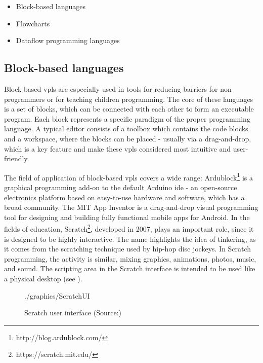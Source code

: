 \begin{itemize}
    \item Block-based languages
    \item Flowcharts
    \item Dataflow programming languages
\end{itemize}

\subsection{Block-based languages}
Block-based \glspl{vpl} are especially used in tools for reducing barriers for non-programmers or for teaching children programming. The core of these languages is a set of blocks, which can be connected with each other to form an executable program. Each block represents a specific paradigm of the proper programming language. A typical editor consists of a toolbox which contains the code blocks and a workspace, where the blocks can be placed - usually via a drag-and-drop, which is a key feature and make these \glspl{vpl} considered most intuitive and user-friendly.

The field of application of block-based \glspl{vpl} covers a wide range: Ardublock\footnote{http://blog.ardublock.com/} is a graphical programming add-on to the default Arduino \gls{ide} - an open-source electronics platform based on easy-to-use hardware and software, which has a broad community. The MIT App Inventor is a drag-and-drop visual programming tool for designing and building fully functional mobile apps for Android.\cite{AppInventor} In the fields of education, Scratch\footnote{https://scratch.mit.edu/}, developed in 2007, plays an important role, since it is designed to be highly interactive. The name highlights the idea of tinkering, as it comes from the scratching technique used by hip-hop disc jockeys. In Scratch programming, the activity is similar, mixing graphics, animations, photos, music, and sound. The scripting area in the Scratch interface is intended to be used like a physical desktop (see )\cite{Scratch}.

\begin{figure}[htbp]
	\centering
	\begin{overpic}[width=0.9\linewidth]{./graphics/ScratchUI}
	\end{overpic}
    \caption[Scratch user interface]%
            {Scratch user interface (Source:\cite{Scratch})}%
	\label{fig:ScratchUI}%
\end{figure}

